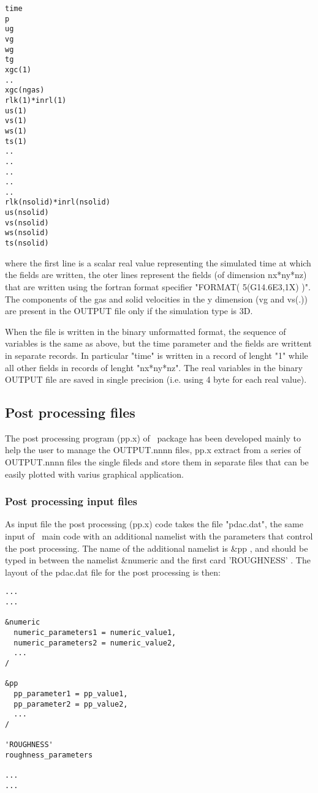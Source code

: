 \begin{verbatim}
time
p
ug
vg
wg
tg
xgc(1)
..
xgc(ngas)
rlk(1)*inrl(1)
us(1)
vs(1)
ws(1)
ts(1)
..
..
..
..
..
rlk(nsolid)*inrl(nsolid)
us(nsolid)
vs(nsolid)
ws(nsolid)
ts(nsolid)
\end{verbatim}

where the first line is a scalar real value representing the 
simulated time at which the fields are written, the oter lines
represent the fields (of dimension nx*ny*nz) that are written 
using the fortran format specifier "FORMAT( 5(G14.6E3,1X) )".
The components of the gas and solid velocities in the y dimension
(vg and vs(.)) are present in the OUTPUT file only if the simulation
type is 3D.

When the file is written in the binary unformatted format,
the sequence of variables is the same as above, but the time
parameter and the fields are writtent in separate records.
In particular "time" is written in a record of lenght "1"
while all other fields in records of lenght "nx*ny*nz".
The real variables in the binary OUTPUT file are saved 
in single precision (i.e. using 4 byte for each real value).

\subsection{Post processing files}
\label{section:file_postprocessing}

The post processing program (pp.x) of \PDAC\ package has
been developed mainly to help the user to manage the
OUTPUT.nnnn files, pp.x extract from a series of 
OUTPUT.nnnn files the single fileds and store them 
in separate files that can be easily plotted with
varius graphical application.

\subsubsection{Post processing input files}

As input file the post processing (pp.x) code 
takes the file "pdac.dat", the same input of \PDAC\ main code
with an additional namelist with the parameters that control
the post processing. The name of the additional namelist is \&pp , and
should be typed in between the namelist \&numeric and the first card
'ROUGHNESS' . The layout of the pdac.dat file for the post processing
is then:

\begin{verbatim}
...
...

&numeric
  numeric_parameters1 = numeric_value1, 
  numeric_parameters2 = numeric_value2,
  ...
/

&pp
  pp_parameter1 = pp_value1,
  pp_parameter2 = pp_value2,
  ...
/

'ROUGHNESS'
roughness_parameters

...
...
\end{verbatim}

